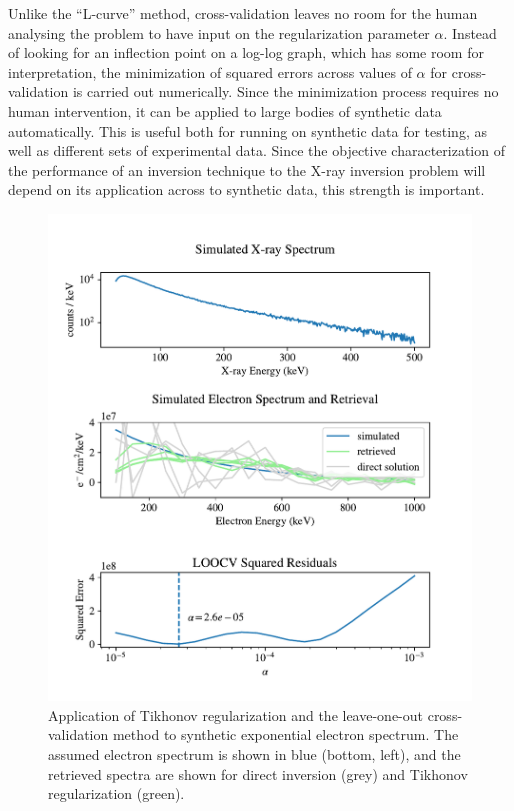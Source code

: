 Unlike the ``L-curve'' method, cross-validation leaves no room for the human analysing the problem to have input on the regularization parameter $\alpha$. Instead of looking for an inflection point on a log-log graph, which has some room for interpretation, the minimization of squared errors across values of $\alpha$ for cross-validation is carried out numerically. Since the minimization process requires no human intervention, it can be  applied to large bodies of synthetic data automatically. This is useful both for running on synthetic data for testing, as well as different sets of experimental data. Since the objective characterization of the performance of an inversion technique to the X-ray inversion problem will depend on its application across to synthetic data, this strength is important. 

\begin{figure}[p]
    \centering
    \includegraphics[width=\textwidth]{figures/chapter_4/cross-validation-example/cross_validation_example.pdf}
    \caption{Application of Tikhonov regularization and the leave-one-out cross-validation method to synthetic exponential electron spectrum. The assumed electron spectrum is shown in blue (bottom, left), and the retrieved spectra are shown for direct inversion (grey) and Tikhonov regularization (green).}
    \label{cross-validation-data}
\end{figure}
\newpage
